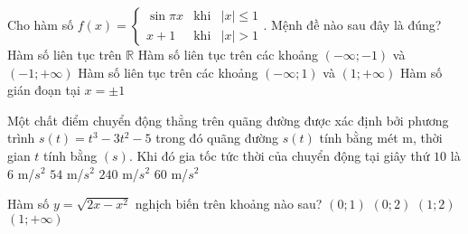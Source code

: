 \begin{ex}%
	Cho hàm số $f(x)=\left\{ \begin{array}{ccc}\sin \pi x & \textrm{khi} & |x| \leq 1 \\ x+1 & \textrm{khi} & |x|>1 \end{array}\right.$. Mệnh đề nào sau đây là đúng?
	\choice
	{ Hàm số liên tục trên $\mathbb{R}$}
	{Hàm số liên tục trên các khoảng $(-\infty;-1)$ và $(-1;+\infty)$}
	{\True Hàm số liên tục trên các khoảng $(-\infty;1)$ và $(1;+\infty)$}
	{Hàm số gián đoạn tại $x=\pm 1$ }
\end{ex}
\begin{ex}%
	Một chất điểm chuyển động thẳng trên quãng đường được xác định bởi phương trình $s(t)=t^3-3t^2-5$ trong đó quãng đường $s(t)$ tính bằng mét m, thời gian $t$ tính bằng $(s)$. Khi đó gia tốc tức thời của chuyển động tại giây thứ $10$ là
	\choice
	{ $6$ m/$s^2$}
	{\True $54$ m/$s^2$}
	{$240$ m/$s^2$}
	{$60$ m/$s^2$}
\end{ex}
\begin{ex}%
	Hàm số $y=\sqrt{2x-x^2}$ nghịch biến trên khoảng nào sau?
	\choice
	{ $(0;1)$}
	{$(0;2)$}
	{\True $(1;2)$}
	{$(1;+\infty)$}
\end{ex}
